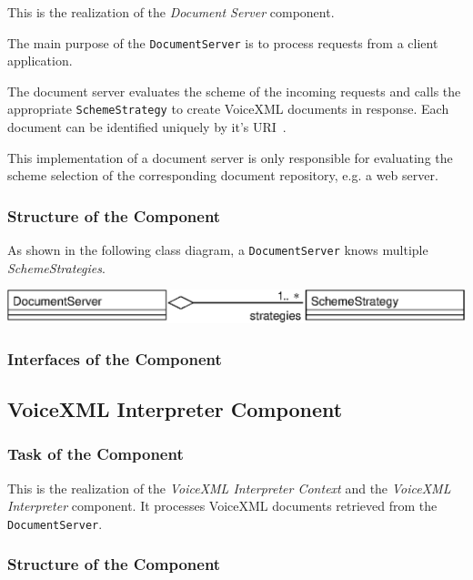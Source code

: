 \documentclass[11pt,a4paper]{article}
\begin{document}
This is the realization of the \emph{Document Server} component.

The main purpose of the \texttt{DocumentServer} is to process requests from a 
client application.

The document server evaluates the scheme of the incoming requests and
calls the appropriate \texttt{SchemeStrategy} to create VoiceXML
documents in response. Each document can be identified uniquely by
it's URI~\cite{w3.org:addressing}.

This implementation of a document server is only responsible for
evaluating the scheme selection of the corresponding document repository,
e.g. a web server.

\subsubsection{Structure of the Component}

As shown in the following class diagram, a \texttt{DocumentServer}
knows multiple \emph{SchemeStrategies}.

\begin{center}
\includegraphics[scale=0.8]{class-documentserver.eps}
\end{center}

\subsubsection{Interfaces of the Component}

\subsection{VoiceXML Interpreter Component}
\label{sec:voic-interpr-comp}

\subsubsection{Task of the Component}

This is the realization of the 
\emph{VoiceXML Interpreter Context} and the \emph{VoiceXML Interpreter}
component. It processes VoiceXML documents retrieved from the
\texttt{DocumentServer}.

\subsubsection{Structure of the Component}
\end{document}
